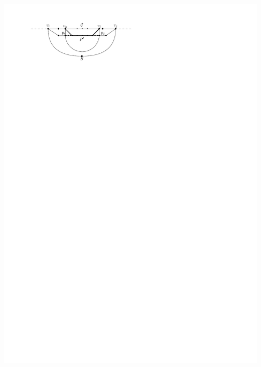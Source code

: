 \documentclass[a4paper]{article}
\begin{document}
\includegraphics[scale=1]{unifiedAlgo/img/sweep/cases/chordUpdate}
\clearpage%
\end{document}
